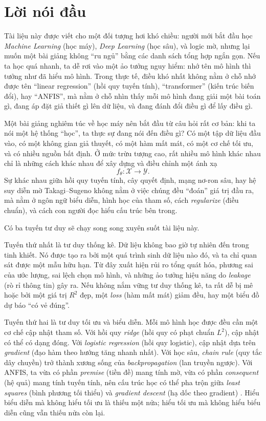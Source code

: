 \chapter*{Lời nói đầu}

Tài liệu này được viết cho một đối tượng hơi khó chiều: người mới bắt đầu học \emph{Machine Learning} (học máy), \emph{Deep Learning} (học sâu), và logic mờ, nhưng lại muốn một bài giảng không ``ru ngủ'' bằng các danh sách tổng hợp ngắn gọn. Nếu ta học quá nhanh, ta dễ rơi vào một ảo tưởng nguy hiểm: nhớ tên mô hình thì tưởng như đã hiểu mô hình. Trong thực tế, điều khó nhất không nằm ở chỗ nhớ được tên ``linear regression'' (hồi quy tuyến tính), ``transformer'' (kiến trúc biến đổi), hay ``ANFIS'', mà nằm ở chỗ nhìn thấy mỗi mô hình đang giải một bài toán gì, đang áp đặt giả thiết gì lên dữ liệu, và đang đánh đổi điều gì để lấy điều gì.

Một bài giảng nghiêm túc về học máy nên bắt đầu từ câu hỏi rất cơ bản: khi ta nói một hệ thống ``học'', ta thực sự đang nói đến điều gì? Có một tập dữ liệu đầu vào, có một không gian giả thuyết, có một hàm mất mát, có một cơ chế tối ưu, và có nhiều nguồn bất định. Ở mức trừu tượng cao, rất nhiều mô hình khác nhau chỉ là những cách khác nhau để xây dựng và điều chỉnh một ánh xạ
\[
f_\theta : \mathcal{X} \to \mathcal{Y}.
\]
Sự khác nhau giữa hồi quy tuyến tính, cây quyết định, mạng nơ-ron sâu, hay hệ suy diễn mờ Takagi--Sugeno không nằm ở việc chúng đều ``đoán'' giá trị đầu ra, mà nằm ở ngôn ngữ biểu diễn, hình học của tham số, cách \emph{regularize} (điều chuẩn), và cách con người đọc hiểu cấu trúc bên trong.

Có ba tuyến tư duy sẽ chạy song song xuyên suốt tài liệu này.

Tuyến thứ nhất là tư duy thống kê. Dữ liệu không bao giờ tự nhiên đến trong tinh khiết. Nó được tạo ra bởi một quá trình sinh dữ liệu nào đó, và ta chỉ quan sát được một mẫu hữu hạn. Từ đây xuất hiện rủi ro tổng quát hóa, phương sai của ước lượng, sai lệch chọn mô hình, và những ảo tưởng hiệu năng do \emph{leakage} (rò rỉ thông tin) gây ra. Nếu không nắm vững tư duy thống kê, ta rất dễ bị mê hoặc bởi một giá trị $R^2$ đẹp, một \emph{loss} (hàm mất mát) giảm đều, hay một biểu đồ dự báo ``có vẻ đúng''.

Tuyến thứ hai là tư duy tối ưu và biểu diễn. Mỗi mô hình học được đều cần một cơ chế cập nhật tham số. Với hồi quy \emph{ridge} (hồi quy có phạt chuẩn $L^2$), cập nhật có thể có dạng đóng. Với \emph{logistic regression} (hồi quy logistic), cập nhật dựa trên \emph{gradient} (đạo hàm theo hướng tăng nhanh nhất). Với học sâu, \emph{chain rule} (quy tắc dây chuyền) trở thành xương sống của \emph{backpropagation} (lan truyền ngược). Với ANFIS, ta vừa có phần \emph{premise} (tiền đề) mang tính mờ, vừa có phần \emph{consequent} (hệ quả) mang tính tuyến tính, nên cấu trúc học có thể pha trộn giữa \emph{least squares} (bình phương tối thiểu) và \emph{gradient descent} (hạ dốc theo gradient) \citep{jang1993anfis}. Hiểu biểu diễn mà không hiểu tối ưu là thiếu một nửa; hiểu tối ưu mà không hiểu biểu diễn cũng vẫn thiếu nửa còn lại.

